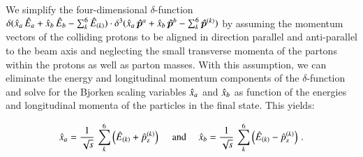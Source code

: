 We simplify the four-dimensional $\delta$-function 
$\delta( \hat{x}_{a} \, \hat{E}_{a} + \hat{x}_{b} \, \hat{E}_{b} - \sum_{k}^{6} \hat{E}_{(k)}) \cdot \delta^{3}( \hat{x}_{a} \, \bm{\hat{p}}^{a} + \hat{x}_{b} \, \bm{\hat{p}}^{b} - \sum_{k}^{6} \bm{\hat{p}}^{(k)})$
by assuming the momentum vectors of the colliding protons to be aligned in direction parallel and anti-parallel to the beam axis 
and neglecting the small transverse momenta of the partons within the protons as well as parton masses.
With this assumption, we can eliminate the energy and longitudinal momentum components of the $\delta$-function 
and solve for the Bjorken scaling variables $\hat{x}_{a}$ and $\hat{x}_{b}$ as function of the energies and longitudinal momenta of the particles in the final state.
This yields:
\begin{linenowrapper}
\begin{equation}
\hat{x}_{a} = \frac{1}{\sqrt{s}} \, \sum_{k}^{6} \left( \hat{E}_{(k)} + \hat{p}_{\textrm{z}}^{(k)} \right) \quad \mbox{ and } \quad
\hat{x}_{b} = \frac{1}{\sqrt{s}} \, \sum_{k}^{6} \left( \hat{E}_{(k)} - \hat{p}_{\textrm{z}}^{(k)} \right) \, .
\label{eq:Bjorkenx}
\end{equation}
\end{linenowrapper}

